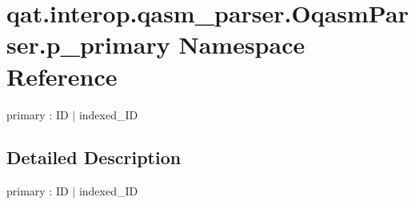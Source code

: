 \hypertarget{namespaceqat_1_1interop_1_1qasm__parser_1_1OqasmParser_1_1p__primary}{\section{qat.\-interop.\-qasm\-\_\-parser.\-Oqasm\-Parser.\-p\-\_\-primary Namespace Reference}
\label{namespaceqat_1_1interop_1_1qasm__parser_1_1OqasmParser_1_1p__primary}
}


primary \-: I\-D $|$ indexed\-\_\-\-I\-D  




\subsection{Detailed Description}
primary \-: I\-D $|$ indexed\-\_\-\-I\-D 
